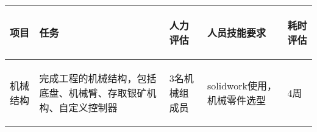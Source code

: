 
\begin{longtable}{ p{2cm} | p{3cm} | p{3cm} | p{4.8cm} | p{2cm} |}

    \hline

    \endfoot
    
    \rowcolor{tabhdcolor}

        \begin{center}
            项目
        \end{center}  &
        \begin{center}
            任务
        \end{center}  &
        \begin{center}
           人力评估
        \end{center} &
        \begin{center}
            人员技能要求
        \end{center}  &
        \begin{center}
            耗时评估
        \end{center}  \\ 
        
    \hline

    \endhead

        \begin{center}
            机械结构
        \end{center} &
        \begin{center}
            完成工程的机械结构，包括底盘、机械臂、存取银矿机构、自定义控制器
        \end{center} &
        \begin{center}
            3名机械组成员
        \end{center} &
        \begin{center}
            solidwork使用，机械零件选型
        \end{center} &
        \begin{center}
            4周
        \end{center}\\
        

\end{longtable}

